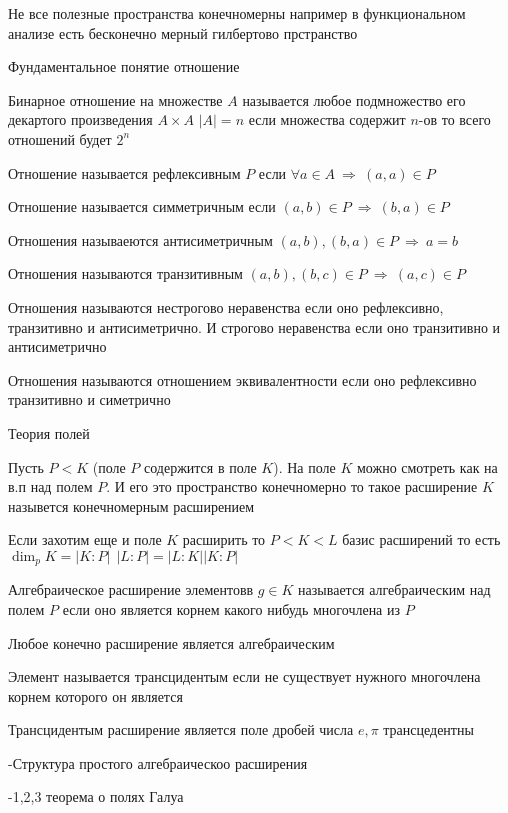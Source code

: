 Не все полезные пространства конечномерны например в функциональном анализе
есть бесконечно мерный гилбертово прстранство

Фундаментальное понятие отношение

Бинарное отношение на множестве $A$ называется любое подмножество его декартого
произведения $A \times A$ $|A| = n$ если множества содержит $n$-ов то всего
отношений будет $2^n$

Отношение называется рефлексивным $P$ если $\forall a \in A ~ \Rightarrow ~
(a,a) \in P$

Отношение называется симметричным если $(a,b) \in P ~ \Rightarrow ~
(b,a) \in P$

Отношения называеются антисиметричным $(a,b), (b,a) \in P ~ \Rightarrow ~ a=b$

Отношения называются транзитивным $(a,b), (b,c) \in P ~ \Rightarrow ~ (a,c) \in
P$

Отношения называются нестрогово неравенства если оно рефлексивно, транзитивно
и антисиметрично. И строгово неравенства если оно транзитивно и антисиметрично

Отношения называются отношением эквивалентности если оно рефлексивно
транзитивно и симетрично

\begin{title}[\large]
  Теория полей
\end{title}

Пусть $P < K$ (поле $P$ содержится в поле $K$). На поле $K$ можно смотреть как
на в.п над полем $P$. И его это пространство конечномерно то такое расширение
$K$ назывется конечномерным расширением

Если захотим еще и поле $K$ расширить то $P<K<L$ базис расширений то есть
$\dim_p K = |K : P| ~~ |L : P| = |L:K||K:P|$

Алгебраическое расширение элементовв $g \in K$ называется алгебраическим над
полем $P$ если оно является корнем какого нибудь многочлена из $P$

\begin{theorem}
  Любое конечно расширение является алгебраическим
\end{theorem}

Элемент называется трансцидентым если не существует нужного многочлена корнем
которого он является

Трансцидентым расширение является поле дробей числа $e, \pi$ трансцедентны

-Структура простого алгебраическоо расширения

-1,2,3 теорема о полях Галуа

